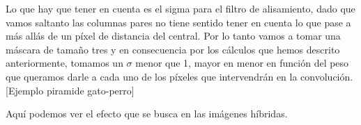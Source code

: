 \documentclass[10pt,a4paper]{article}
\begin{document}
Lo que hay que tener en cuenta es el sigma para el filtro de alisamiento, dado que vamos saltanto las columnas pares no tiene sentido tener en cuenta lo que pase a más allás de un píxel de distancia del central. Por lo tanto vamos a tomar una máscara de tamaño tres y en consecuencia por los cálculos que hemos descrito anteriormente, tomamos un $\sigma$ menor que 1, mayor en menor en función del peso que queramos darle a cada uno de los píxeles que intervendrán en la convolución.\\

[Ejemplo piramide gato-perro]

Aquí podemos ver el efecto que se busca en las imágenes híbridas.\\
\end{document}
